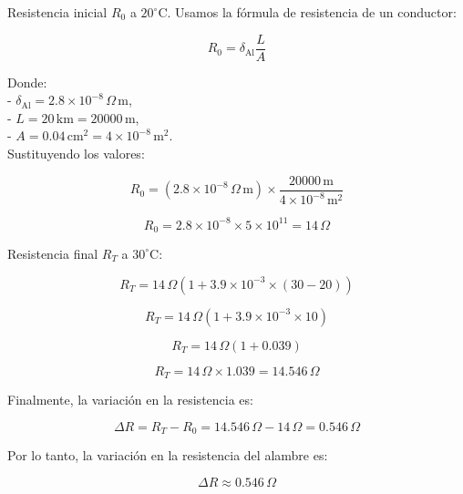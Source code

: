 \documentclass[answers]{exam} %
\begin{document}
\begin{questions}
	Resistencia inicial \(R_0\) a \(20^\circ \text{C}\). Usamos la fórmula de resistencia de un conductor:

	\[
		R_0 = \delta_{\text{Al}} \frac{L}{A}
	\]

	Donde:\\
	- \(\delta_{\text{Al}} = 2.8 \times 10^{-8} \, \Omega \, \text{m}\),\\
	- \(L = 20 \, \text{km} = 20000 \, \text{m}\),\\
	- \(A = 0.04 \, \text{cm}^2 = 4 \times 10^{-8} \, \text{m}^2\).\\

	Sustituyendo los valores:

	\[
		R_0 = (2.8 \times 10^{-8} \, \Omega \, \text{m}) \times \frac{20000 \, \text{m}}{4 \times 10^{-8} \, \text{m}^2}
	\]

	\[
		R_0 = 2.8 \times 10^{-8} \times 5 \times 10^{11} = 14 \, \Omega
	\]

	Resistencia final \(R_T\) a \(30^\circ \text{C}\):

	\[
		R_T = 14 \, \Omega \left( 1 + 3.9 \times 10^{-3} \times (30 - 20) \right)
	\]

	\[
		R_T = 14 \, \Omega \left( 1 + 3.9 \times 10^{-3} \times 10 \right)
	\]

	\[
		R_T = 14 \, \Omega \left( 1 + 0.039 \right)
	\]

	\[
		R_T = 14 \, \Omega \times 1.039 = 14.546 \, \Omega
	\]

	Finalmente, la variación en la resistencia es:

	\[
		\Delta R = R_T - R_0 = 14.546 \, \Omega - 14 \, \Omega = 0.546 \, \Omega
	\]

	Por lo tanto, la variación en la resistencia del alambre es:

	\[
		\Delta R \approx 0.546 \, \Omega
	\]


	\begin{figure}[h]
		\centering

	\end{figure}




\end{questions}
\end{document}
